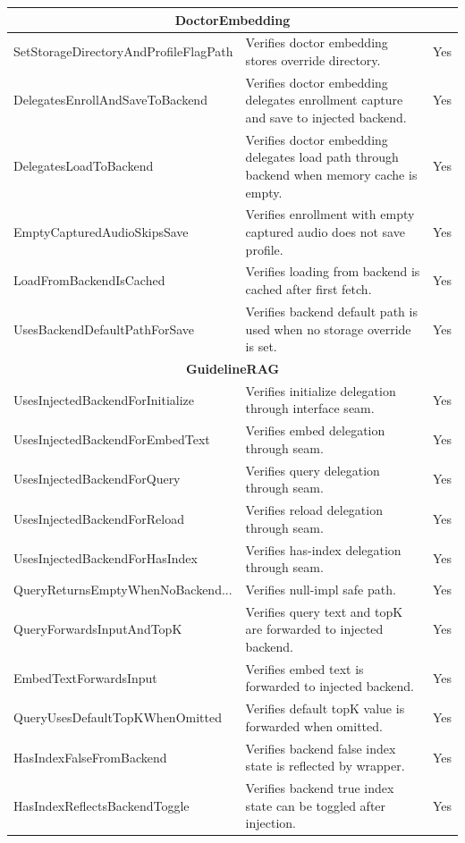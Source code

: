 \begin{longtable}{|p{}|p{}|c|}
\hline
\multicolumn{3}{|c|}{\textbf{DoctorEmbedding}} \\
\hline
SetStorageDirectoryAndProfileFlagPath & Verifies doctor embedding stores override directory. & Yes \\ \hline
DelegatesEnrollAndSaveToBackend & Verifies doctor embedding delegates enrollment capture and save to injected backend. & Yes \\ \hline
DelegatesLoadToBackend & Verifies doctor embedding delegates load path through backend when memory cache is empty. & Yes \\ \hline
EmptyCapturedAudioSkipsSave & Verifies enrollment with empty captured audio does not save profile. & Yes \\ \hline
LoadFromBackendIsCached & Verifies loading from backend is cached after first fetch. & Yes \\ \hline
UsesBackendDefaultPathForSave & Verifies backend default path is used when no storage override is set. & Yes \\ \hline

\hline
\multicolumn{3}{|c|}{\textbf{GuidelineRAG}} \\
\hline
UsesInjectedBackendForInitialize & Verifies initialize delegation through interface seam. & Yes \\ \hline
UsesInjectedBackendForEmbedText & Verifies embed delegation through seam. & Yes \\ \hline
UsesInjectedBackendForQuery & Verifies query delegation through seam. & Yes \\ \hline
UsesInjectedBackendForReload & Verifies reload delegation through seam. & Yes \\ \hline
UsesInjectedBackendForHasIndex & Verifies has-index delegation through seam. & Yes \\ \hline
QueryReturnsEmptyWhenNoBackend... & Verifies null-impl safe path. & Yes \\ \hline
QueryForwardsInputAndTopK & Verifies query text and topK are forwarded to injected backend. & Yes \\ \hline
EmbedTextForwardsInput & Verifies embed text is forwarded to injected backend. & Yes \\ \hline
QueryUsesDefaultTopKWhenOmitted & Verifies default topK value is forwarded when omitted. & Yes \\ \hline
HasIndexFalseFromBackend & Verifies backend false index state is reflected by wrapper. & Yes \\ \hline
HasIndexReflectsBackendToggle & Verifies backend true index state can be toggled after injection. & Yes \\ \hline


\end{longtable}
